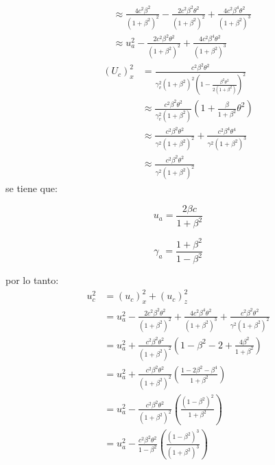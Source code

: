 \documentclass[12pt,letterpaper]{report}
\begin{document}
\begin{enumerate}
\begin{align*}
        & \approx \frac{4c^2 \beta^2}{(1+\beta^2)^2} - \frac{2c^2 \beta^2 \theta^2}{(1+\beta^2)^2} + \frac{4c^2 \beta^4 \theta^2}{(1+\beta^2)^3}\\
        & \approx u_a^2 - \frac{2c^2 \beta^2 \theta^2}{(1+\beta^2)^2} + \frac{4c^2 \beta^4 \theta^2}{(1+\beta^2)^3} 
    \end{align*}
    \begin{align*}
        (U_c)_x^2 &= \frac{c^2 \beta^2 \theta^2}{\gamma_v^2 (1+\beta^2)^2 \left(1-\frac{\beta^2 \theta^2}{2(1+\beta^2)} \right)^2}\\
        &\approx \frac{c^2 \beta^2 \theta^2 }{\gamma^2_v (1+\beta^2)} \left(1+\frac{\beta}{1+\beta^2}\theta^2 \right)\\
        &\approx \frac{c^2 \beta^2 \theta^2}{\gamma^2 (1+\beta^2)^2} + \frac{c^2 \beta^4 \theta^4}{\gamma^2 (1+\beta^2)^3}\\
        &\approx \frac{c^2 \beta^2 \theta^2}{\gamma^2 (1+\beta^2)^2}
    \end{align*}
    se tiene que:\\
    \begin{minipage}{0.5\linewidth}
        \begin{equation*}
            u_a = \frac{2\beta c}{1+\beta^2}
        \end{equation*}
    \end{minipage}
    \begin{minipage}{0.5\linewidth}
        \begin{equation*}
            \gamma_a = \frac{1+\beta^2}{1-\beta^2}
        \end{equation*}
    \end{minipage}
    por lo tanto:
    \begin{align*}
        u_c^2&= (u_c)_x^2+(u_c)_z^2 \\
        & = u_a^2 - \frac{2c^2 \beta^2 \theta^2}{(1+\beta^2)^2} + \frac{4c^2 \beta^4 \theta^2}{(1+\beta^2)^3}+\frac{c^2 \beta^2 \theta^2}{\gamma^2 (1+\beta^2)^2} \\
        & =u_a^2 + \frac{c^2 \beta^2 \theta^2}{(1+\beta^2)^2}\left(1-\beta^2-2 + \frac{4\beta^2}{1+\beta^2} \right)\\
        & = u_a^2 + \frac{c^2 \beta^2 \theta^2 }{(1+\beta^2)^2 }\left(\frac{1-2\beta^2-\beta^4}{1+\beta^2} \right) \\
        &= u_a^2 - \frac{c^2 \beta^2 \theta^2 }{(1+\beta^2)^2 }\left(\frac{(1-\beta^2)^2}{1+\beta^2} \right) \\
        & = u_a^2 -\frac{c^2 \beta^2 \theta^2}{1-\beta^2} \left(\frac{(1-\beta^2)^3}{(1+\beta^2)^3}\right)\\

\end{align*}
\end{enumerate}
\end{document}
